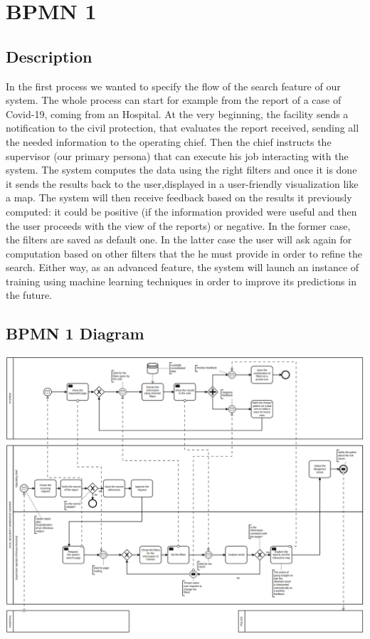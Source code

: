 \documentclass[../main.tex]{subfiles}
\begin{document}
    \chapter{BPMN 1}\label{ch:bpmn-1}
    \section{Description}\label{sec:description2}
    In the first process we wanted to specify the flow of the search feature of our system. The whole process can start for example from the report of a case of Covid-19, coming from an Hospital. At the very beginning, the facility sends a notification to the civil protection, that evaluates the report received, sending all the needed information to the operating chief. Then the chief instructs the supervisor (our primary persona) that can execute his job interacting with the system. The system computes the data using the right filters and once it is done it sends the results back to the user,displayed in a user-friendly visualization like a map. The system will then receive feedback based on the results it previously computed: it could be positive (if the information provided were useful and then the user proceeds with the view of the reports) or negative. In the former case, the filters are saved as default one. In the latter case the user will ask again for computation based on other filters that the he must provide in order to refine the search.
    Either way, as an advanced feature, the system will launch an instance of training using machine learning techniques in order to improve its predictions in the future.

    \section{BPMN 1 Diagram}\label{sec:bpmn-1-diagram}
    \includegraphics[scale = 0.40]{assets/bpmn1.png}
\end{document}
